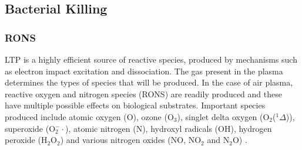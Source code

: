 \documentclass[11pt, oneside]{article}   	%
\begin{document}
%
%
%

\subsection{Bacterial Killing}
\subsubsection{RONS}
LTP is a highly efficient source of reactive species, produced by mechanisms such as electron impact excitation and dissociation.
The gas present in the plasma determines the types of species that will be produced. 
In the case of air plasma, reactive oxygen and nitrogen species (RONS) are readily produced and these have multiple possible effects on biological substrates.
Important species produced include atomic oxygen (O), ozone (O$_3$), singlet delta oxygen (O$_2$($^1\Delta$)), superoxide (O$_2^-\cdot$), atomic nitrogen (N), hydroxyl radicals (OH), hydrogen peroxide (H$_2$O$_2$) and various nitrogen oxides (NO, NO$_2$ and N$_2$O) \cite{Graves2014low}.
\end{document}

